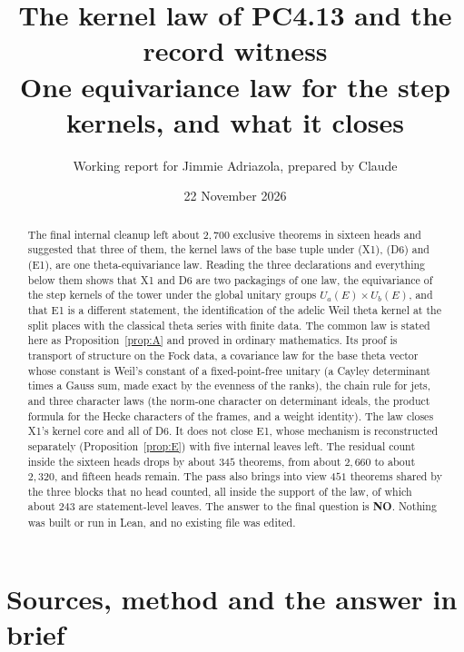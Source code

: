 \documentclass[11pt]{article}
\title{The kernel law of PC4.13 and the record witness\\ One equivariance law for the step kernels, and what it closes}
\author{Working report for Jimmie Adriazola, prepared by Claude}
\date{22 November 2026}
\theoremstyle{definition}
\theoremstyle{remark}
\begin{document}
\maketitle

\begin{abstract}
The final internal cleanup left about $2{,}700$ exclusive theorems in sixteen heads and suggested that three of them, the kernel laws of the base tuple under  (X1),  (D6) and  (E1), are one theta-equivariance law. Reading the three declarations and everything below them shows that X1 and D6 are two packagings of one law, the equivariance of the step kernels of the tower under the global unitary groups $U_a(E)\times U_b(E)$, and that E1 is a different statement, the identification of the adelic Weil theta kernel at the split places with the classical theta series with finite data. The common law is stated here as Proposition~\ref{prop:A} and proved in ordinary mathematics. Its proof is transport of structure on the Fock data, a covariance law for the base theta vector whose constant is Weil's constant of a fixed-point-free unitary (a Cayley determinant times a Gauss sum, made exact by the evenness of the ranks), the chain rule for jets, and three character laws (the norm-one character on determinant ideals, the product formula for the Hecke characters of the frames, and a weight identity). The law closes X1's kernel core and all of D6. It does not close E1, whose mechanism is reconstructed separately (Proposition~\ref{prop:E}) with five internal leaves left. The residual count inside the sixteen heads drops by about $345$ theorems, from about $2{,}660$ to about $2{,}320$, and fifteen heads remain. The pass also brings into view $451$ theorems shared by the three blocks that no head counted, all inside the support of the law, of which about $243$ are statement-level leaves. The answer to the final question is \textbf{NO}. Nothing was built or run in Lean, and no existing file was edited.
\end{abstract}

\tableofcontents

\section{Sources, method and the answer in brief}
\end{document}

